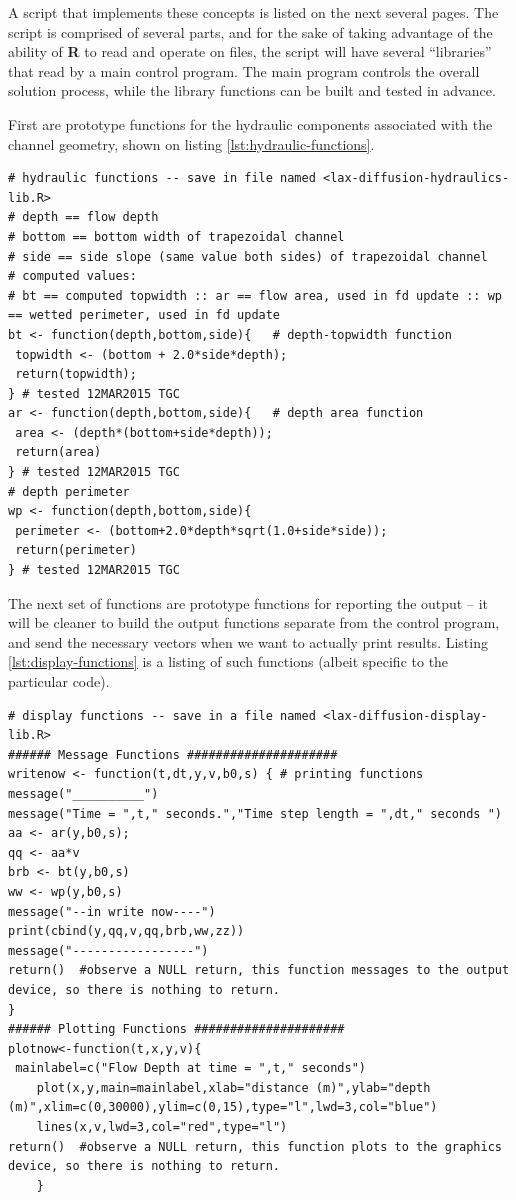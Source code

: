 A script that implements these concepts is listed on the next several pages.
The script is comprised of several parts, and for the sake of taking advantage of the ability of \textbf{R} to read and operate on files, the script will have several ``libraries'' that read by a main control program.
The main program controls the overall solution process, while the library functions can be built and tested in advance.

First are prototype functions for the hydraulic components associated with the channel geometry, shown on listing \ref{lst:hydraulic-functions}.

\begin{lstlisting}[caption=R code demonstrating prototype hydraulic functions, label=lst:hydraulic-functions]
# hydraulic functions -- save in file named <lax-diffusion-hydraulics-lib.R>
# depth == flow depth          
# bottom == bottom width of trapezoidal channel
# side == side slope (same value both sides) of trapezoidal channel
# computed values:
# bt == computed topwidth :: ar == flow area, used in fd update :: wp == wetted perimeter, used in fd update
bt <- function(depth,bottom,side){   # depth-topwidth function
 topwidth <- (bottom + 2.0*side*depth);
 return(topwidth);
} # tested 12MAR2015 TGC
ar <- function(depth,bottom,side){   # depth area function
 area <- (depth*(bottom+side*depth));
 return(area)
} # tested 12MAR2015 TGC
# depth perimeter
wp <- function(depth,bottom,side){   
 perimeter <- (bottom+2.0*depth*sqrt(1.0+side*side));
 return(perimeter)
} # tested 12MAR2015 TGC
\end{lstlisting}

The next set of functions are prototype functions for reporting the output -- it will be cleaner to build the output functions separate from the control program, and send the necessary vectors when we want to actually print results.
Listing \ref{lst:display-functions} is a listing of such functions (albeit specific to the particular code).

\begin{lstlisting}[caption=R code demonstrating prototype display (printing) functions, label=lst:display-functions]
# display functions -- save in a file named <lax-diffusion-display-lib.R>
###### Message Functions #####################
writenow <- function(t,dt,y,v,b0,s) { # printing functions
message("__________")
message("Time = ",t," seconds.","Time step length = ",dt," seconds ")
aa <- ar(y,b0,s);
qq <- aa*v
brb <- bt(y,b0,s)
ww <- wp(y,b0,s)
message("--in write now----")
print(cbind(y,qq,v,qq,brb,ww,zz))
message("-----------------")
return()  #observe a NULL return, this function messages to the output device, so there is nothing to return.
}
###### Plotting Functions #####################
plotnow<-function(t,x,y,v){
 mainlabel=c("Flow Depth at time = ",t," seconds")
	plot(x,y,main=mainlabel,xlab="distance (m)",ylab="depth (m)",xlim=c(0,30000),ylim=c(0,15),type="l",lwd=3,col="blue")
	lines(x,v,lwd=3,col="red",type="l")
return()  #observe a NULL return, this function plots to the graphics device, so there is nothing to return.
	}
\end{lstlisting}



